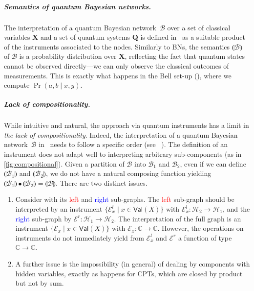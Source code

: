 \documentclass[10pt,a4paper]{article}
\newcommand{\sem}[1]{\llparenthesis{#1}\rrparenthesis}
\newcommand*{\setofrv}[1]{\mathsf{Val}(#1)}
\newcommand*{\somebayes}{\mathcal{B}}
\newcommand{\bX}{\mathbf X}
\newcommand{\Eop}{\mathcal E}
\newcommand*{\C}{\mathbb{C}}
\newcommand{\HH}{\mathcal{H}}
\newcommand{\bQ}{\mathbf Q}
\newcommand*{\QBN}{quantum Bayesian network}
\newtheorem{remark}[theorem]{Remark}
\begin{document}

\subparagraph{Semantics of \QBN s.} 

The interpretation of a \QBN\ $\somebayes$ over a set of classical variables $\bX$ and a set of quantum systems $\bQ$ is defined in~\cite{GBN2014} as a suitable product of the instruments associated to the nodes.
Similarly to BNs, the semantics $\sem{\somebayes}$ of $\somebayes$ is a probability distribution over $\bX$, reflecting the fact that quantum states cannot be observed directly---we can only observe the classical outcomes of measurements.
This is exactly what happens in the Bell set-up (), where we compute $\Pr(a,b\mid x,y)$. 

\subparagraph{Lack of compositionality.}
\label{sec:lack}

While intuitive and natural, the approach via quantum instruments has a limit in \emph{the lack of compositionality}.
Indeed, the interpretation of a \QBN\ $\somebayes$ in~\cite{GBN2014} needs to follow a specific order (see ~\cite[page~12]{GBN2014}).
The definition of an instrument does not adapt well to interpreting arbitrary sub-components (as in \cref{fig:compositional}).
Given a partition of $\somebayes$ into $\somebayes_1$ and $\somebayes_2$, even if we can define $\sem{\somebayes_1}$ and $\sem{\somebayes_2}$, we do not have a natural composing function yielding $\sem{\somebayes_1} \bullet \sem{\somebayes_2}=\sem{\somebayes}$.
There are two distinct issues.
\begin{enumerate}
\item
Consider  with its \textcolor{red}{left} and \textcolor{blue}{right} sub-graphs.
The \textcolor{red}{left} sub-graph should be interpreted by an instrument $\{\Eop^l_x \mid x \in\setofrv{X}\}$ with $\Eop^l_x : \HH_2\to \HH_1$, and the \textcolor{blue}{right} sub-graph by $\Eop^r : \HH_1\to \HH_2$.
The interpretation of the full graph is an instrument $\{\Eop_x \mid x \in\setofrv{X}\}$ with $\Eop_x:\C\to\C$. 
However, the operations on instruments do not immediately yield from $\Eop^l_x$ and $\Eop^r$ a function of type $\C\to\C$.
\item
A further issue is the impossibility (in general) of dealing by components with hidden variables, exactly as happens for CPTs, which are closed by product but not by sum.
\end{enumerate}
\end{document}
